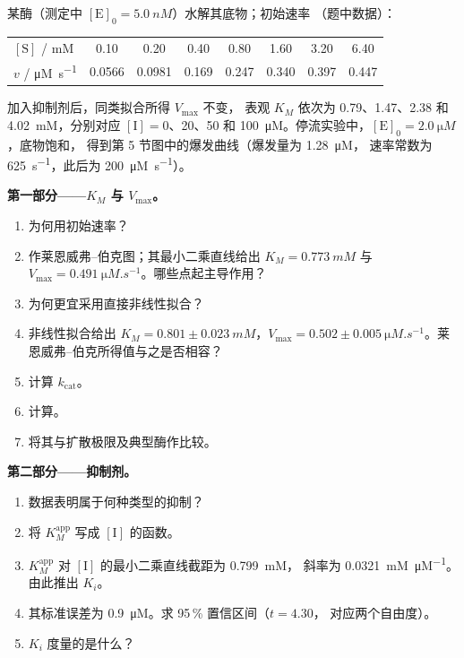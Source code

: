 \begin{problem}
\label{pb:b3:complex-kinetics:1}
某酶（测定中 $[\mathrm E]_0 = \qty{5.0}{nM}$）水解其底物；初始速率
（题中数据）：
\begin{center}\small
\begin{tabular}{lccccccc}
\hline
$[\mathrm S]$ / mM & 0.10 & 0.20 & 0.40 & 0.80 & 1.60 & 3.20 & 6.40 \\
$v$ / \unit{\micro M.s^{-1}} & 0.0566 & 0.0981 & 0.169 & 0.247 & 0.340 & 0.397 & 0.447 \\ \hline
\end{tabular}
\end{center}
加入抑制剂后，同类拟合所得 $V_{\max}$ 不变，
表观 $K_M$ 依次为 0.79、1.47、2.38 和 \qty{4.02}{mM}，分别对应 $[\mathrm I] = 0$、20、50 和
\qty{100}{\micro M}。停流实验中，$[\mathrm E]_0 = \qty{2.0}{\micro M}$，底物饱和，
得到第 5 节图中的爆发曲线（爆发量为 \qty{1.28}{\micro M}，
速率常数为 \qty{625}{s^{-1}}，此后为 \qty{200}{\micro M.s^{-1}}）。

\medskip\noindent\textbf{第一部分——$K_M$ 与 $V_{\max}$。}
\begin{enumerate}
  \item 为何用初始速率？
  \item 作莱恩威弗–伯克图；其最小二乘直线给出 $K_M =
        \qty{0.773}{mM}$ 与 $V_{\max} = \qty{0.491}{\micro M.s^{-1}}$。哪些点起主导作用？
  \item 为何更宜采用直接非线性拟合？
  \item 非线性拟合给出 $K_M = 0.801 \pm \qty{0.023}{mM}$，$V_{\max} = 0.502 \pm
        \qty{0.005}{\micro M.s^{-1}}$。莱恩威弗–伯克所得值与之是否相容？
  \item 计算 $k_{\mathrm{cat}}$。
  \item 计算。
  \item 将其与扩散极限及典型酶作比较。
\end{enumerate}

\medskip\noindent\textbf{第二部分——抑制剂。}
\begin{enumerate}[resume]
  \item 数据表明属于何种类型的抑制？
  \item 将 $K_M^{\mathrm{app}}$ 写成 $[\mathrm I]$ 的函数。
  \item $K_M^{\mathrm{app}}$ 对 $[\mathrm I]$ 的最小二乘直线截距为 \qty{0.799}{mM}，
        斜率为 \qty{0.0321}{mM.\micro M^{-1}}。由此推出 $K_i$。
  \item 其标准误差为 \qty{0.9}{\micro M}。求 95\,\% 置信区间（$t = 4.30$，
        对应两个自由度）。
  \item $K_i$ 度量的是什么？
\end{enumerate}


\end{problem}
